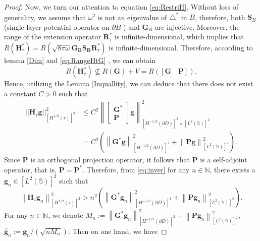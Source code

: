 \documentclass[11pt,reqno,twoside]{amsart}
\theoremstyle{definition}
\theoremstyle{remark}
\numberwithin{equation}{section}
\begin{document}
\begin{proof}
Now, we turn our attention to equation \eqref{eq:RestriH}. Without loss of generality, we assume that $\omega ^2$ is not an eigenvalue of $ \triangle ^*$ in $B$, therefore, both $\mathbf S _B$ (single-layer potential operator on $\partial B$ ) and $\mathbf G _B$ are injective. Moreover, the range of the extension operator $\mathbf R^*_{\tau} $ is infinite-dimensional, which implies that $ R \left( \mathbf H^*_{\tau} \right) = R \left( \sqrt{8\pi\omega}\mathbf{G_B S_B}  \mathbf R^*_{\tau}   \right) $ is infinite-dimensional. Therefore, according to lemma \ref{Dim} and \eqref{eq:RangeHtG} , we can obtain
$$
R \left( \mathbf H^*_{\tau} \right) \nsubseteq R\left( \mathbf G\right) +V=  R \left( \left[ \mathbf G \quad \mathbf P \right] \right).
$$
Hence, utilizing the Lemma \ref{Inquallity}, we can deduce that there does not exist a constant $C > 0$ such that
\begin{equation}\begin{aligned}\label{eq:inver}
|| \mathbf H_{\tau} \mathbf g ||^2_{\left[H^{1/2}\left(\tau \right) \right] ^2 }
&\leq C^2 \left\| 
\begin{bmatrix}
	\mathbf G^* \\ \mathbf P
\end{bmatrix}
\mathbf g \right\| ^2_{\left[H^{-1/2}\left(\partial D \right) \right] ^2  \times \left[L^{2}\left(\mathbb S \right) \right] ^2}\\
&=  C^2 \left( \left\| \mathbf G^* \mathbf g \right\|^2_{\left[H^{-1/2}\left(\partial D \right) \right] ^2}+\left\| \mathbf P \mathbf g \right\|^2_{\left[L^{2}\left(\mathbb S \right) \right] ^2} \right) .
\end{aligned}\end{equation}
Since $\mathbf P$ is an orthogonal projection operator, it follows that $\mathbf P$ is a self-adjoint operator, that is, $\mathbf P = \mathbf P ^*$. Therefore, from \eqref{eq:inver} for any $n \in \mathbb N$, there exists a $\mathbf g_n \in \left[L^{2}\left(\mathbb S \right) \right] ^2  $ such that
$$
\left\| \mathbf H_{\tau} \mathbf g_n \right\|^2_{\left[H^{1/2}\left(\tau \right) \right] ^2 } > n^2 \left( \left\| \mathbf G^* \mathbf g_n \right\|^2_{\left[H^{-1/2}\left(\partial D \right) \right] ^2}+\left\| \mathbf P \mathbf g_n \right\|^2_{\left[L^{2}\left(\mathbb S \right) \right] ^2} \right).
$$
For any $n \in \mathbb N$, we denote $M_n:=\left\| \mathbf G^* \mathbf g_n \right\|^2_{\left[H^{-1/2}\left(\partial D \right) \right] ^2}+\left\| \mathbf P \mathbf g_n \right\|^2_{\left[L^{2}\left(\mathbb S \right) \right] ^2}$,  $\tilde{\mathbf g_n}:=\mathbf g_n /\left(\sqrt{n M_n} \right) $. Then on one hand, we have

\end{proof}
\end{document}
